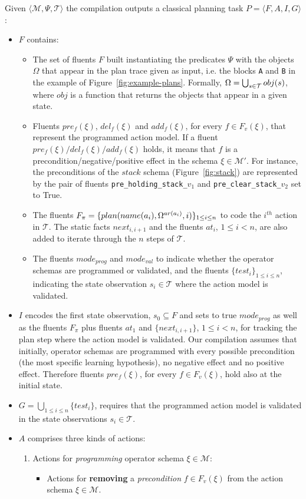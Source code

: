 \documentclass[letterpaper]{article} %
\newcommand{\tup}[1]{{\langle #1 \rangle}}
\begin{document}
Given $\tup{\mathcal{M},\Psi,\mathcal{T}}$ the compilation outputs a classical planning task $P=\tup{F,A,I,G}$:
\begin{itemize}
\item $F$ contains:
\begin{itemize}
\item The set of fluents $F$ built instantiating the predicates $\Psi$ with the objects $\Omega$ that appear in the plan trace given as input, i.e. the blocks {\tt\small A} and {\tt\small B} in the example of Figure~\ref{fig:example-plans}. Formally, $\Omega=\bigcup_{\small s\in\mathcal{T}} obj(s)$, where $obj$ is a function that returns the objects that appear in a given state.
\item Fluents $pre_f(\xi)$, $del_f(\xi)$ and $add_f(\xi)$, for every $f\in F_v(\xi)$, that represent the programmed action model. If a fluent $pre_f(\xi)/del_f(\xi)/add_f(\xi)$ holds, it means that $f$ is a precondition/negative/positive effect in the schema $\xi\in \mathcal{M}'$. For instance, the preconditions of the $stack$ schema (Figure~\ref{fig:stack}) are represented by the pair of fluents {\small\tt pre\_holding\_stack\_$v_1$} and {\small\tt pre\_clear\_stack\_$v_2$} set to True.
\item The fluents $F_{\pi}=\{plan(name(a_i),\Omega^{ar(a_i)},i)\}_{\small 1\leq i\leq n}$ to code the $i^{th}$ action in $\mathcal{T}$. The static facts $next_{i,i+1}$ and the fluents $at_i$, {\small $1\leq i< n$}, are also added to iterate through the $n$ steps of $\mathcal{T}$.
\item The fluents $mode_{prog}$ and $mode_{val}$ to indicate whether the operator schemas are programmed or validated, and the fluents $\{test_i\}_{1\leq i\leq n}$, indicating the state observation $s_i\in\mathcal{T}$ where the action model is validated.
\end{itemize}
\item $I$ encodes the first state observation, $s_0\subseteq F$ and sets to true $mode_{prog}$ as well as the fluents $F_{\pi}$ plus fluents $at_1$ and $\{next_{i,i+1}\}$, {\small $1\leq i<n$}, for tracking the plan step where the action model is validated. Our compilation assumes that initially, operator schemas are programmed with every possible precondition (the most specific learning hypothesis), no negative effect and no positive effect. Therefore fluents $pre_f(\xi)$, for every $f\in F_v(\xi)$, hold also at the initial state.

\item $G=\bigcup_{1\leq i\leq n}\{test_i\}$, requires that the programmed action model is validated in the state observations $s_i\in\mathcal{T}$.
\item $A$ comprises three kinds of actions:
\begin{enumerate}
\item Actions for {\em programming} operator schema $\xi\in\mathcal{M}$:
\begin{itemize}
\item Actions for {\bf removing} a {\em precondition} $f\in F_v(\xi)$ from the action schema $\xi\in\mathcal{M}$.


\end{itemize}
\end{enumerate}
\end{itemize}
\end{document}

